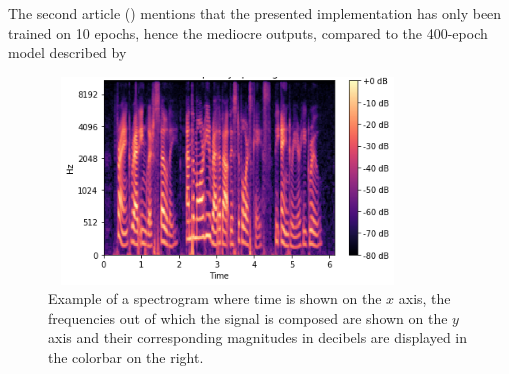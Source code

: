 \documentclass[conference]{IEEEtran}
\begin{document}
	The second article (\textcite{hetherly2017audio}) mentions that the presented implementation has only been trained on 10 epochs, hence the mediocre outputs, compared to the 400-epoch model described by \textcite{kuleshov2017audio}

	
\begin{figure}[htbp]
		\centerline{\includegraphics[width=9.5cm,height=5.5cm]{spectrogram.png}}
\caption{Example of a spectrogram where time is shown on the $ x $ axis, the frequencies out of which the signal is composed are shown on the $ y $ axis and their corresponding magnitudes in decibels are displayed in the colorbar on the right.}
\label{fig}
\end{figure}



		
\printbibliography
\vspace{12pt}
\end{document}
